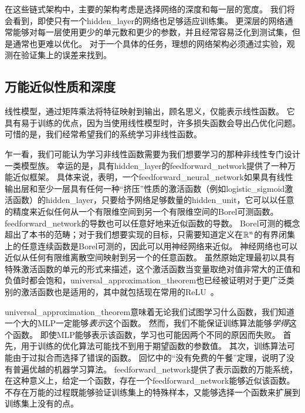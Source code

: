 在这些链式架构中，主要的架构考虑是选择网络的深度和每一层的宽度。
我们将会看到，即使只有一个\gls{hidden_layer}的网络也足够适应训练集。
更深层的网络通常能够对每一层使用更少的单元数和更少的参数，并且经常容易泛化到测试集，但是通常也更难以优化。
对于一个具体的任务，理想的网络架构必须通过实验，观测在验证集上的误差来找到。

\subsection{万能近似性质和深度}
\label{sec:universal_approximation_properties_and_depth}

线性模型，通过矩阵乘法将特征映射到输出，顾名思义，仅能表示线性函数。
它具有易于训练的优点，因为当使用线性模型时，许多损失函数会导出凸优化问题。
可惜的是，我们经常希望我们的系统学习非线性函数。

乍一看，我们可能认为学习非线性函数需要为我们想要学习的那种非线性专门设计一类模型族。
幸运的是，具有\gls{hidden_layer}的\gls{feedforward_network}提供了一种万能近似框架。
具体来说，\citep{Hornik89,Cybenko89}表明，一个\gls{feedforward_neural_network}如果具有线性输出层和至少一层具有任何一种``挤压''性质的激活函数（例如\gls{logistic_sigmoid}激活函数）的\gls{hidden_layer}，只要给予网络足够数量的\gls{hidden_unit}，它可以以任意的精度来近似任何从一个有限维空间到另一个有限维空间的Borel可测函数。
\gls{feedforward_network}的导数也可以任意好地来近似函数的导数\citep{hornik1990universal}。
Borel可测的概念超出了本书的范畴；对于我们想要实现的目标，只需要知道定义在$\mathbb{R}^n$的有界闭集上的任意连续函数是Borel可测的，因此可以用神经网络来近似。
神经网络也可以近似从任何有限维离散空间映射到另一个的任意函数。
虽然原始定理最初以具有特殊激活函数的单元的形式来描述，这个激活函数当变量取绝对值非常大的正值和负值时都会饱和，\gls{universal_approximation_theorem}也已经被证明对于更广泛类别的激活函数也是适用的，其中就包括现在常用的\gls{ReLU}~\citep{Leshno-et-al-1993}。


\gls{universal_approximation_theorem}意味着无论我们试图学习什么函数，我们知道一个大的MLP一定能够\emph{表示}这个函数。
然而，我们不能保证训练算法能够\emph{学得}这个函数。
即使MLP能够表示该函数，学习也可能因两个不同的原因而失败。
首先，用于训练的优化算法可能找不到用于期望函数的参数值。
其次，训练算法可能由于过拟合而选择了错误的函数。
回忆中的``没有免费的午餐''定理，说明了没有普遍优越的机器学习算法。
\gls{feedforward_network}提供了表示函数的万能系统，在这种意义上，给定一个函数，存在一个\gls{feedforward_network}能够近似该函数。
不存在万能的过程既能够验证训练集上的特殊样本，又能够选择一个函数来扩展到训练集上没有的点。

